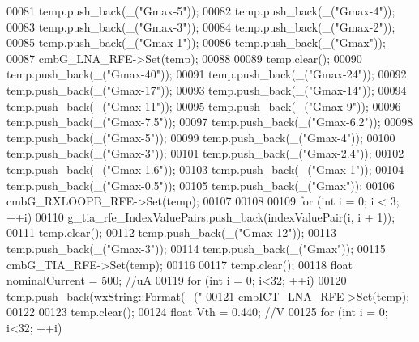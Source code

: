 \begin{DoxyCode}
{00081     temp.push\_back(\_(\textcolor{stringliteral}{"Gmax-5"}));
00082     temp.push\_back(\_(\textcolor{stringliteral}{"Gmax-4"}));
00083     temp.push\_back(\_(\textcolor{stringliteral}{"Gmax-3"}));
00084     temp.push\_back(\_(\textcolor{stringliteral}{"Gmax-2"}));
00085     temp.push\_back(\_(\textcolor{stringliteral}{"Gmax-1"}));
00086     temp.push\_back(\_(\textcolor{stringliteral}{"Gmax"}));
00087     cmbG_LNA_RFE->Set(temp);
00088 
00089     temp.clear();
00090     temp.push\_back(\_(\textcolor{stringliteral}{"Gmax-40"}));
00091     temp.push\_back(\_(\textcolor{stringliteral}{"Gmax-24"}));
00092     temp.push\_back(\_(\textcolor{stringliteral}{"Gmax-17"}));
00093     temp.push\_back(\_(\textcolor{stringliteral}{"Gmax-14"}));
00094     temp.push\_back(\_(\textcolor{stringliteral}{"Gmax-11"}));
00095     temp.push\_back(\_(\textcolor{stringliteral}{"Gmax-9"}));
00096     temp.push\_back(\_(\textcolor{stringliteral}{"Gmax-7.5"}));
00097     temp.push\_back(\_(\textcolor{stringliteral}{"Gmax-6.2"}));
00098     temp.push\_back(\_(\textcolor{stringliteral}{"Gmax-5"}));
00099     temp.push\_back(\_(\textcolor{stringliteral}{"Gmax-4"}));
00100     temp.push\_back(\_(\textcolor{stringliteral}{"Gmax-3"}));
00101     temp.push\_back(\_(\textcolor{stringliteral}{"Gmax-2.4"}));
00102     temp.push\_back(\_(\textcolor{stringliteral}{"Gmax-1.6"}));
00103     temp.push\_back(\_(\textcolor{stringliteral}{"Gmax-1"}));
00104     temp.push\_back(\_(\textcolor{stringliteral}{"Gmax-0.5"}));
00105     temp.push\_back(\_(\textcolor{stringliteral}{"Gmax"}));
00106     cmbG_RXLOOPB_RFE->Set(temp);
00107 
00108 
00109     \textcolor{keywordflow}{for} (\textcolor{keywordtype}{int} i = 0; i < 3; ++i)
00110         g_tia_rfe_IndexValuePairs.push\_back(indexValuePair(i, i + 1));
00111     temp.clear();
00112     temp.push\_back(\_(\textcolor{stringliteral}{"Gmax-12"}));
00113     temp.push\_back(\_(\textcolor{stringliteral}{"Gmax-3"}));
00114     temp.push\_back(\_(\textcolor{stringliteral}{"Gmax"}));
00115     cmbG_TIA_RFE->Set(temp);
00116 
00117     temp.clear();
00118     \textcolor{keywordtype}{float} nominalCurrent = 500; \textcolor{comment}{//uA}
00119     \textcolor{keywordflow}{for} (\textcolor{keywordtype}{int} i = 0; i<32; ++i)
00120         temp.push\_back(wxString::Format(\_(\textcolor{stringliteral}{"%
00121     cmbICT_LNA_RFE->Set(temp);
00122 
00123     temp.clear();
00124     \textcolor{keywordtype}{float} Vth = 0.440; \textcolor{comment}{//V}
00125     \textcolor{keywordflow}{for} (\textcolor{keywordtype}{int} i = 0; i<32; ++i)
}}
\end{DoxyCode}
